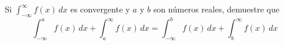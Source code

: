 \item Si $\int_{-\infty}^{\infty} f(x) \, dx$ es convergente y $a$ y $b$ son números reales, demuestre que
    \[ \int_{-\infty}^{a} f(x) \, dx + \int_{a}^{\infty} f(x) \, dx = \int_{-\infty}^{b} f(x) \, dx + \int_{b}^{\infty} f(x) \, dx \]
